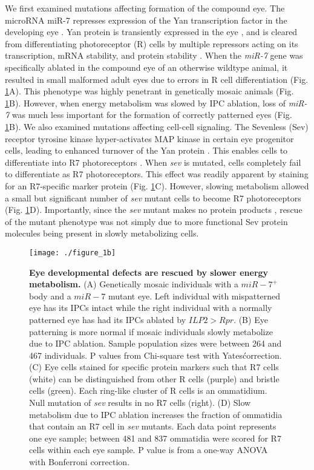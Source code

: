 We first examined mutations affecting formation of the compound eye. The microRNA miR-7 represses expression of the Yan transcription factor in the developing eye \cite{Li2005}. Yan protein is transiently expressed in the eye \cite{Pelaez2015a}, and is cleared from differentiating photoreceptor (R) cells by multiple repressors acting on its transcription, mRNA stability, and protein stability \cite{Graham2010}. When the \textit{miR-7} gene was specifically ablated in the compound eye of an otherwise wildtype animal, it resulted in small malformed adult eyes due to errors in R cell differentiation (Fig. \ref{fig:metabolism:fig1b}A). This phenotype was highly penetrant in genetically mosaic animals (Fig. \ref{fig:metabolism:fig1b}B). However, when energy metabolism was slowed by IPC ablation, loss of \textit{miR-7} was much less important for the formation of correctly patterned eyes (Fig. \ref{fig:metabolism:fig1b}B). We also examined mutations affecting cell-cell signaling. The Sevenless (Sev) receptor tyrosine kinase hyper-activates MAP kinase in certain eye progenitor cells, leading to enhanced turnover of the Yan protein \cite{Rebay1995}. This enables cells to differentiate into R7 photoreceptors \cite{Voas2004}. When \textit{sev} is mutated, cells completely fail to differentiate as R7 photoreceptors. This effect was readily apparent by staining for an R7-specific marker protein (Fig. \ref{fig:metabolism:fig1b}C). However, slowing metabolism allowed a small but significant number of \textit{sev} mutant cells to become R7 photoreceptors (Fig. \ref{fig:metabolism:fig1b}D). Importantly, since the \textit{sev} mutant makes no protein products \cite{Banerjee1987}, rescue of the mutant phenotype was not simply due to more functional Sev protein molecules being present in slowly metabolizing cells.

\begin{figure}[h!]
\centering
\texttt{[image: ./figure\_1b]}
\caption[Eye developmental defects are rescued by slower energy metabolism.]{\textbf{Eye developmental defects are rescued by slower energy metabolism.} (A) Genetically mosaic individuals with a $miR-7^+$ body and a $miR-7$ mutant eye. Left individual with mispatterned eye has its IPCs intact while the right individual with a normally patterned eye has had its IPCs ablated by $ILP2>Rpr$. (B) Eye patterning is more normal if mosaic individuals slowly metabolize due to IPC ablation. Sample population sizes were between 264 and 467 individuals. P values from Chi-square test with Yates\' correction. (C) Eye cells stained for specific protein markers such that R7 cells (white) can be distinguished from other R cells (purple) and bristle cells (green). Each ring-like cluster of R cells is an ommatidium. Null mutation of \textit{sev} results in no R7 cells (right). (D) Slow metabolism due to IPC ablation increases the fraction of ommatidia that contain an R7 cell in \textit{sev} mutants. Each data point represents one eye sample; between 481 and 837 ommatidia were scored for R7 cells within each eye sample. P value is from a one-way ANOVA with Bonferroni correction.}
\label{fig:metabolism:fig1b}
\end{figure}


